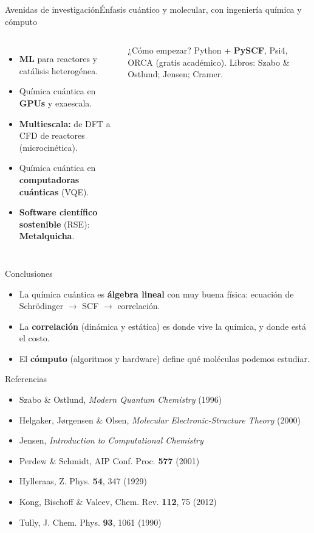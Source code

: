 \documentclass[aspectratio=169]{beamer}
\begin{document}
\begin{frame}{Avenidas de investigación}{Énfasis cuántico y molecular, con ingeniería química y cómputo}
  \begin{columns}[T,onlytextwidth]
      \begin{itemize}\setlength\itemsep{3pt}
        \item \textbf{ML} para reactores y catálisis heterogénea.
        \item Química cuántica en \textbf{GPUs} y exaescala.
        \item \textbf{Multiescala:} de DFT a CFD de reactores (microcinética).
        \item Química cuántica en \textbf{computadoras cuánticas} (VQE).
        \item \textbf{Software científico sostenible} (RSE): \textbf{Metalquicha}.
      \end{itemize}
      \begin{exampleblock}{¿Cómo empezar?}
        \small Python + \textbf{PySCF}, Psi4, ORCA (gratis académico). Libros: Szabo \& Ostlund; Jensen; Cramer.
      \end{exampleblock}
  \end{columns}
\end{frame}

\begin{frame}{Conclusiones}
  \begin{itemize}\setlength\itemsep{8pt}
    \item La química cuántica es \textbf{álgebra lineal} con muy buena física: ecuación de Schrödinger $\to$ SCF $\to$ correlación.
    \item La \textbf{correlación} (dinámica y estática) es donde vive la química, y donde está el costo.
    \item El \textbf{cómputo} (algoritmos y hardware) define qué moléculas podemos estudiar.
  \end{itemize}
\end{frame}

\begin{frame}[noframenumbering]{Referencias}
  \footnotesize
  \begin{itemize}\setlength\itemsep{1pt}
    \item Szabo \& Ostlund, \emph{Modern Quantum Chemistry} (1996)
    \item Helgaker, Jørgensen \& Olsen, \emph{Molecular Electronic-Structure Theory} (2000)
    \item Jensen, \emph{Introduction to Computational Chemistry}
    \item Perdew \& Schmidt, AIP Conf. Proc. \textbf{577} (2001)
    \item Hylleraas, Z. Phys. \textbf{54}, 347 (1929)
    \item Kong, Bischoff \& Valeev, Chem. Rev. \textbf{112}, 75 (2012)
    \item Tully, J. Chem. Phys. \textbf{93}, 1061 (1990)
  \end{itemize}
\end{frame}
\end{document}
